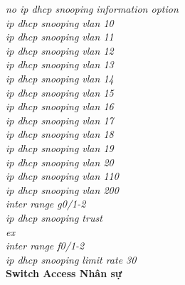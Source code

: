 \documentclass[12pt,a4paper]{report}
\begin{document}
\hspace*{2cm}\textit{no ip dhcp snooping information option\\
\hspace*{2cm}ip dhcp snooping vlan 10\\
\hspace*{2cm}ip dhcp snooping vlan 11\\
\hspace*{2cm}ip dhcp snooping vlan 12\\
\hspace*{2cm}ip dhcp snooping vlan 13\\
\hspace*{2cm}ip dhcp snooping vlan 14\\
\hspace*{2cm}ip dhcp snooping vlan 15\\
\hspace*{2cm}ip dhcp snooping vlan 16\\
\hspace*{2cm}ip dhcp snooping vlan 17\\
\hspace*{2cm}ip dhcp snooping vlan 18\\
\hspace*{2cm}ip dhcp snooping vlan 19\\
\hspace*{2cm}ip dhcp snooping vlan 20\\
\hspace*{2cm}ip dhcp snooping vlan 110\\
\hspace*{2cm}ip dhcp snooping vlan 200\\
\hspace*{2cm}inter range g0/1-2\\
\hspace*{2cm}ip dhcp snooping trust\\
\hspace*{2cm}ex\\
\hspace*{2cm}inter range f0/1-2\\
\hspace*{2cm}ip dhcp snooping limit rate 30\\}
\hspace*{1cm}\textbf{Switch Access Nhân sự}\\
\end{document}
